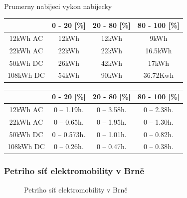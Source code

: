 \documentclass[a4paper,11pt]{article}
\begin{document}
Prumerny nabijeci vykon nabijecky
\smallskip

\begin{center}
    \vspace{0.5cm} %
    \begin{tabular}{|c|c|c|c|}
        \hline
        \textbf{} & \textbf{0 - 20 [\%]} & \textbf{20 - 80 [\%]} & \textbf{80 - 100 [\%]}\\
        \hline
        12kWh AC  &  12kWh  & 12kWh & 9kWh  \\
        \hline
        22kWh AC  &  22kWh  & 22kWh & 16.5kWh  \\
        \hline
        50kWh DC  &  26kWh  & 42kWh & 17kWh    \\
        \hline
        108kWh DC &  54kWh  & 90kWh & 36.72Kwh \\
        \hline
    \end{tabular}
    \vspace{0.5cm} %
\end{center}

\begin{center}
    \vspace{0.5cm} %
    \begin{tabular}{|c|c|c|c|}
        \hline
        \textbf{} & \textbf{0 - 20 [\%]} & \textbf{20 - 80 [\%]} & \textbf{80 - 100 [\%]}\\
        \hline
        12kWh AC  &  0 -- 1.19h.  & 0 -- 3.58h. & 0 -- 2.38h.  \\
        \hline
        22kWh AC  &  0 -- 0.65h.  & 0 -- 1.95h. & 0 -- 1.30h.  \\
        \hline
        50kWh DC  &  0 -- 0.573h. & 0 -- 1.01h. & 0 -- 0.82h.  \\
        \hline
        108kWh DC &  0 -- 0.26h.  & 0 -- 0.47h. & 0 -- 0.38h.  \\
        \hline
    \end{tabular}
    \vspace{0.5cm} %
\end{center}

\subsubsection{Petriho síť elektromobility v Brně}

\begin{figure}[H]
    \centering
    \caption{Petriho síť elektromobility v Brně}
    \label{figure:ims-petri-net}
\end{figure}
\end{document}
